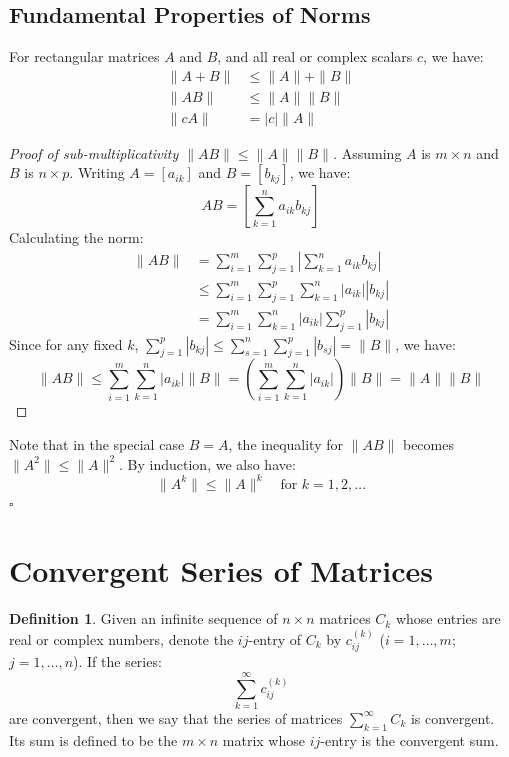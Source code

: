 \documentclass[12pt,a4paper]{report}
\theoremstyle{definition}
\newtheorem{definition}[theorem]{Definition}
\numberwithin{equation}{chapter}
\begin{document}
\subsection*{Fundamental Properties of Norms}
For rectangular matrices $A$ and $B$, and all real or complex scalars $c$, we have:
\begin{align}
\|A + B\| &\le \|A\| + \|B\| \\
\|AB\| &\le \|A\|\|B\| \\
\|cA\| &= |c|\|A\|
\end{align}

\begin{proof}[Proof of sub-multiplicativity $\|AB\| \le \|A\|\|B\|$]
Assuming $A$ is $m \times n$ and $B$ is $n \times p$. Writing $A = [a_{ik}]$ and $B = [b_{kj}]$, we have:
\begin{equation}
AB = \left[ \sum_{k=1}^n a_{ik}b_{kj} \right]
\end{equation}
Calculating the norm:
\begin{equation}
\begin{aligned}
\|AB\| &= \sum_{i=1}^m \sum_{j=1}^p \left| \sum_{k=1}^n a_{ik}b_{kj} \right| \\
&\le \sum_{i=1}^m \sum_{j=1}^p \sum_{k=1}^n |a_{ik}||b_{kj}| \\
&= \sum_{i=1}^m \sum_{k=1}^n |a_{ik}| \sum_{j=1}^p |b_{kj}|
\end{aligned}
\end{equation}
Since for any fixed $k$, $\sum_{j=1}^p |b_{kj}| \le \sum_{s=1}^n \sum_{j=1}^p |b_{sj}| = \|B\|$, we have:
\begin{equation}
\|AB\| \le \sum_{i=1}^m \sum_{k=1}^n |a_{ik}| \|B\| = \left( \sum_{i=1}^m \sum_{k=1}^n |a_{ik}| \right) \|B\| = \|A\|\|B\|
\end{equation}
\end{proof}

Note that in the special case $B = A$, the inequality for $\|AB\|$ becomes $\|A^2\| \le \|A\|^2$. By induction, we also have:
\begin{equation}
\|A^k\| \le \|A\|^k \quad \text{for } k = 1, 2, \ldots
\end{equation}
\hfill $\square$

\section{Convergent Series of Matrices}
\begin{definition}
Given an infinite sequence of $n \times n$ matrices $C_k$ whose entries are real or complex numbers, denote the $ij$-entry of $C_k$ by $c_{ij}^{(k)}$ ($i = 1, \ldots, m$; $j = 1, \ldots, n$). If the series:
\begin{equation}
\sum_{k=1}^\infty c_{ij}^{(k)}
\end{equation}
are convergent, then we say that the series of matrices $\sum_{k=1}^\infty C_k$ is convergent. Its sum is defined to be the $m \times n$ matrix whose $ij$-entry is the convergent sum.
\end{definition}
\end{document}
